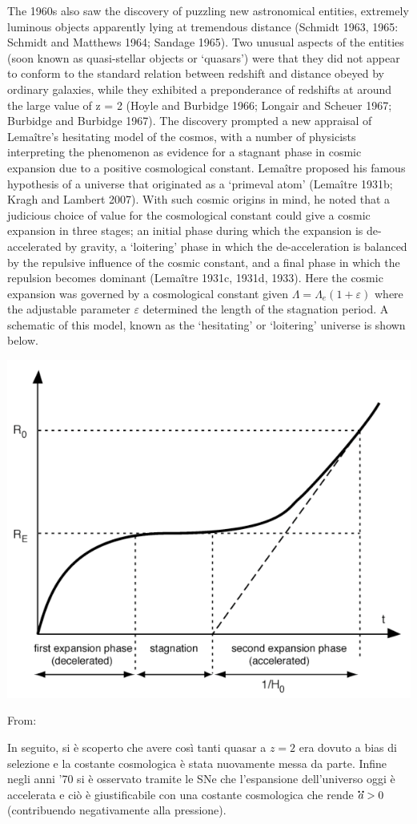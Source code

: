 \begin{definition}
    The 1960s also saw the discovery of puzzling new astronomical entities, extremely luminous
objects apparently lying at tremendous distance (Schmidt 1963, 1965: Schmidt and Matthews
1964; Sandage 1965). Two unusual aspects of the entities (soon known as quasi-stellar
objects or ‘quasars’) were that they did not appear to conform to the standard relation
between redshift and distance obeyed by ordinary galaxies, while they exhibited a
preponderance of redshifts at around the large value of z = 2 (Hoyle and Burbidge 1966;
Longair and Scheuer 1967; Burbidge and Burbidge 1967). The discovery prompted a new
appraisal of Lemaître’s hesitating model of the cosmos, with a number of
physicists interpreting the phenomenon as evidence for a stagnant phase in cosmic expansion
due to a positive cosmological constant.
Lemaître proposed his famous hypothesis of a universe that originated as a ‘primeval atom’ (Lemaître
1931b; Kragh and Lambert 2007). With such cosmic origins in mind, he noted that a
judicious choice of value for the cosmological constant could give a cosmic expansion in
three stages; an initial phase during which the expansion is de-accelerated by gravity, a
‘loitering’ phase in which the de-acceleration is balanced by the repulsive influence of the
cosmic constant, and a final phase in which the repulsion becomes dominant (Lemaître
1931c, 1931d, 1933). Here the cosmic expansion was governed by a cosmological constant
given $\Lambda=\Lambda_e (1+\varepsilon)$ where the adjustable parameter $\varepsilon$ determined the length of the stagnation period. A schematic of this model, known as the ‘hesitating’ or ‘loitering’ universe is shown below.

\includegraphics[width=.6\textwidth]{Pictures/2/Uhesitating.png}
\vspace*{0.5em}

From: \cite{oraifeartaigh_one_2018}
\end{definition}
\vspace*{0.5em}
In seguito, si è scoperto che avere così tanti quasar a $z=2$ era dovuto a bias di selezione e la costante cosmologica è stata nuovamente messa da parte. Infine negli anni '70 si è osservato tramite le SNe che l'espansione dell'universo oggi è accelerata e ciò è giustificabile con una costante cosmologica che rende $\accentset{\mbox{\large\bfseries ..}}{a}>0$ (contribuendo negativamente alla pressione).

